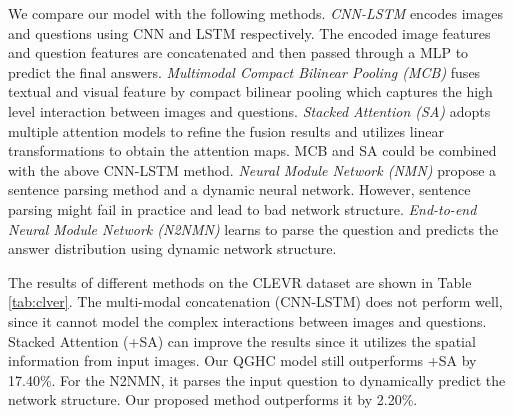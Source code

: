 \documentclass[runningheads]{llncs}
\begin{document}
We compare our model with the following methods. \emph{CNN-LSTM} \cite{antol2015vqa} encodes images and questions using CNN and LSTM respectively. The encoded image features and question features are concatenated and then passed through a MLP to predict the final answers. \emph{Multimodal Compact Bilinear Pooling (MCB)} \cite{fukui2016multimodal} fuses textual and visual feature by compact bilinear pooling which captures the high level interaction between images and questions.
\emph{Stacked Attention (SA)} \cite{yang2016stacked} adopts multiple attention models to refine the fusion results and utilizes linear transformations to obtain the attention maps. MCB and SA could be combined with the above CNN-LSTM method.
\emph{Neural Module Network (NMN)} \cite{andreas2016neural} propose a sentence parsing method and a dynamic neural network. However, sentence parsing might fail in practice and lead to bad network structure.
\emph{End-to-end Neural Module Network (N2NMN)} \cite{hu2017learning} learns to parse the question and predicts the answer distribution using dynamic network structure.

The results of different methods on the CLEVR dataset are shown in Table \ref{tab:clver}. The multi-modal concatenation (CNN-LSTM) does not perform well, since it cannot model the complex interactions between images and questions. Stacked Attention (+SA) can improve the results since it utilizes the spatial information from input images. Our QGHC model still outperforms +SA by 17.40\%. 
For the N2NMN, it parses the input question to dynamically predict the network structure. Our proposed method outperforms it by 2.20\%.
\end{document}
